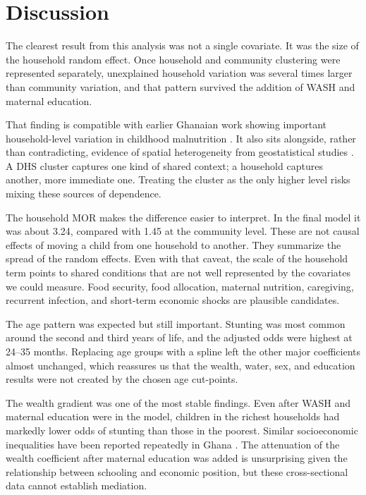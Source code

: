 \documentclass[11pt]{article}
\begin{document}
\section{Discussion}

The clearest result from this analysis was not a single covariate. It was the size of the household random effect. Once household and community clustering were represented separately, unexplained household variation was several times larger than community variation, and that pattern survived the addition of WASH and maternal education.

That finding is compatible with earlier Ghanaian work showing important household-level variation in childhood malnutrition \citep{AhetoEtAl2015}. It also sits alongside, rather than contradicting, evidence of spatial heterogeneity from geostatistical studies \citep{AhetoDagne2021,AmoakoJohnson2022}. A DHS cluster captures one kind of shared context; a household captures another, more immediate one. Treating the cluster as the only higher level risks mixing these sources of dependence.

The household MOR makes the difference easier to interpret. In the final model it was about 3.24, compared with 1.45 at the community level. These are not causal effects of moving a child from one household to another. They summarize the spread of the random effects. Even with that caveat, the scale of the household term points to shared conditions that are not well represented by the covariates we could measure. Food security, food allocation, maternal nutrition, caregiving, recurrent infection, and short-term economic shocks are plausible candidates.

The age pattern was expected but still important. Stunting was most common around the second and third years of life, and the adjusted odds were highest at 24--35 months. Replacing age groups with a spline left the other major coefficients almost unchanged, which reassures us that the wealth, water, sex, and education results were not created by the chosen age cut-points.

The wealth gradient was one of the most stable findings. Even after WASH and maternal education were in the model, children in the richest households had markedly lower odds of stunting than those in the poorest. Similar socioeconomic inequalities have been reported repeatedly in Ghana \citep{SeworJayalakshmi2024,OsborneEtAl2025}. The attenuation of the wealth coefficient after maternal education was added is unsurprising given the relationship between schooling and economic position, but these cross-sectional data cannot establish mediation.
\end{document}
